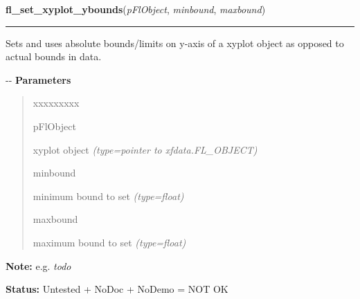     \vspace{0.5ex}

\hspace{.8\funcindent}\begin{boxedminipage}{\funcwidth}

    \raggedright \textbf{fl\_set\_xyplot\_ybounds}(\textit{pFlObject}, \textit{minbound}, \textit{maxbound})

    \vspace{-1.5ex}

    \rule{\textwidth}{0.5\fboxrule}
\setlength{\parskip}{2ex}

Sets and uses absolute bounds/limits on y-axis of a xyplot object as
opposed to actual bounds in data.

-{}-
\setlength{\parskip}{1ex}
      \textbf{Parameters}
      \vspace{-1ex}

      \begin{quote}
        \begin{Ventry}{xxxxxxxxx}

          \item[pFlObject]


xyplot object
            {\it (type=pointer to xfdata.FL\_OBJECT)}

          \item[minbound]


minimum bound to set
            {\it (type=float)}

          \item[maxbound]


maximum bound to set
            {\it (type=float)}

        \end{Ventry}

      \end{quote}

\textbf{Note:} 
e.g. \emph{todo}


\textbf{Status:} 
Untested + NoDoc + NoDemo = NOT OK


    \end{boxedminipage}

    \label{xformslib:flxyplot:fl_get_xyplot_xbounds}

    \vspace{0.5ex}

